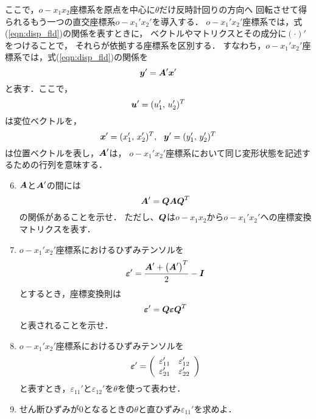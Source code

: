 \documentclass[10pt,a4j]{jarticle}
\begin{document}
ここで，$o-x_1x_2$座標系を原点を中心に$\theta$だけ反時計回りの方向へ
回転させて得られるもう一つの直交座標系$o-x_1'x_2'$を導入する．
$o-x_1'x_2'$座標系では，式(\ref{eqn:disp_fld})の関係を表すときに，
ベクトルやマトリクスとその成分に$(\cdot)'$をつけることで，
それらが依拠する座標系を区別する．
すなわち，$o-x_1'x_2'$座標系では，式(\ref{eqn:disp_fld})の関係を
\begin{equation}
	\mbox{\boldmath $y$}'=\mbox{\boldmath $A$}'\mbox{\boldmath $x$}'
	\label{eqn:disp_fld2}
\end{equation}
と表す．ここで，
\begin{equation}
	\mbox{\boldmath $u$}'=(u_1',\, u_2')^T
\end{equation}
は変位ベクトルを，
\begin{equation}
	\mbox{\boldmath $x$}'=(x_1',\, x_2')^T, \ \ \mbox{\boldmath $y$}'=(y_1',\, y_2')^T
\end{equation}
は位置ベクトルを表し，$\mbox{\boldmath $A$}'$は，
$o-x_1'x_2'$座標系において同じ変形状態を記述するための行列を意味する．
\begin{enumerate}
\setcounter{enumi}{5}
\item
	$\mbox{\boldmath $A$}$と$\mbox{\boldmath $A$}'$の間には
	\[
		\mbox{\boldmath $A$}'=\mbox{\boldmath $Q$}\mbox{\boldmath $A$}\mbox{\boldmath $Q$}^T
	\]
	の関係があることを示せ．
	ただし、$\mbox{\boldmath $Q$}$は$o-x_1x_2$から$o-x_1'x_2'$への座標変換マトリクスを表す．
\item
	$o-x_1'x_2'$座標系におけるひずみテンソルを
	\[
		\mbox{\boldmath $\varepsilon$}'=\frac{\mbox{\boldmath $A$}'+\left(\mbox{\boldmath $A$}'\right)^T}{2}-\mbox{\boldmath $I$}
	\]
	とするとき，座標変換則は
	\[
		\mbox{\boldmath $\varepsilon$}'=\mbox{\boldmath $Q$}\mbox{\boldmath $\varepsilon$}\mbox{\boldmath $Q$}^T
	\]
	と表されることを示せ．
\item
	$o-x_1'x_2'$座標系におけるひずみテンソルを
	\[
	\mbox{\boldmath $\varepsilon$}'
	=
	\left(
	\begin{array}{cc}
		\varepsilon_{11}' & \varepsilon_{12}' \\
		\varepsilon_{21}' & \varepsilon_{22}'
	\end{array}
	\right)
	\]
	と表すとき，$\varepsilon_{11}'$と$\varepsilon_{12}'$を$\theta$を使って表わせ．
\item
	せん断ひずみが0となるときの$\theta$と直ひずみ$\varepsilon_{11}'$を求めよ．
\end{enumerate}
\end{document}
